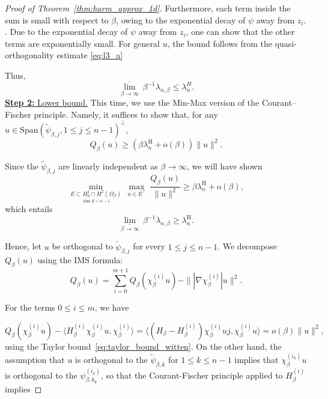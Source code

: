 \documentclass[10pt]{article}
\newcommand{\psitilde}{\widetilde\psi}
\newcommand{\1}{\mathbbm 1}
\renewcommand{\o}{\mathrm{o}}
\begin{document}
\begin{proof}[Proof of Theorem~\ref{thm:harm_approx_1d}]
        Furthermore, each term inside the sum is small with respect to $\beta$, owing to the exponential decay of $\psi$ away from $z_i$. .
        Due to the exponential decay of $\psi$ away from $z_i$, one can show that the other terms are exponentially small.
        For general $u$, the bound follows from the quasi-orthogonality estimate \eqref{eq:l3_a}

        Thus,
        $$\underset{\beta\to\infty}{\overline\lim}\,\beta^{-1}\lambda_{n,\beta} \leq \lambda_n^{H}.$$
        {\underline{{\bf Step 2: }Lower bound.}\newline}
        This time, we use the Min-Max version of the Courant--Fischer principle. Namely, it suffices to show that, for any $u \in \mathrm{Span}(\psitilde_{\beta,j}, 1\leq j \leq n-1)^\perp$, 
        $$ Q_\beta(u) \geq (\beta\lambda_n^{\mathrm{H}} + \o(\beta))\|u\|^2.$$

        Since the $\psitilde_{\beta,j}$ are linearly independent as $\beta\to\infty$, we will have shown
        $$ \underset{\underset{\dim E = n-1}{E\subset H_0^1\cap H^2(\Omega_\beta)}}{\min}\,\underset{u\in E^\intercal}{\max}\,\frac{Q_\beta(u)}{\|u\|^2} \geq \beta\lambda_n^{\mathrm{H}} + \o(\beta),$$
        which entails
        \[\underset{\beta\to\infty}{\underline\lim}\,\beta^{-1}\lambda_{n,\beta} \geq \lambda_n^{\mathrm{H}}.\]

        Hence, let $u$ be orthogonal to $\psitilde_{\beta,j}$ for every $1\leq j \leq n-1$. We decompose $Q_\beta(u)$ using the IMS formula:
        \[Q_\beta(u) = \sum_{i=0}^{m+1} Q_\beta(\chi_\beta^{(i)}u) - \||\nabla \chi_\beta^{(i)}|u\|^2.\]

        For the terms $0\leq i \leq m$, we have

        \begin{equation}
            Q_\beta(\chi_\beta^{(i)}u)-\langle H_\beta^{(i)}\chi_\beta^{(i)}u,\chi_\beta^{(i)}\rangle = \langle (H_\beta-H_\beta^{(i)})\chi_\beta^{(i)}uj,\chi_\beta^{(i)}u\rangle = o(\beta)\|u\|^2,
        \end{equation}
        using the Taylor bound~\eqref{eq:taylor_bound_witten}. On the other hand, the assumption that $u$ is orthogonal to the $\widetilde \psi_{\beta,k}$ for $1\leq k \leq n-1$ implies that $\chi_\beta^{(i_k)}u$ is orthogonal to the $\psi_{\beta,k_k}^{(i_k)}$, so that the
        Courant-Fischer principle applied to $H_\beta^{(i)}$ implies


\end{proof}
\end{document}
